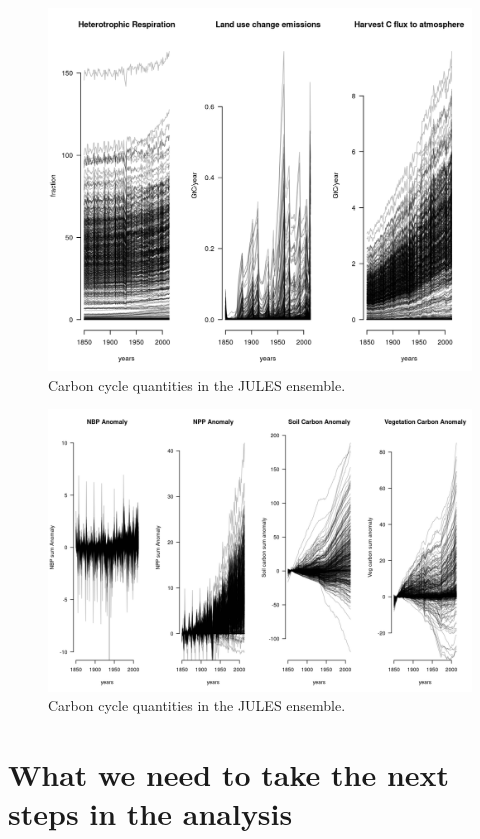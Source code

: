 \documentclass[gmd, manuscript]{copernicus}
\begin{document}
%
\begin{figure}[t]
\includegraphics[width=12cm]{./graphics/plot-carbon-cycle-timeseries-tertiary-1.png}
\caption{Carbon cycle quantities in the JULES ensemble.}
\end{figure}

%
\begin{figure}[t]
\includegraphics[width=12cm]{./graphics/plot-carbon-cycle-anomaly-timeseries-1}
\caption{Carbon cycle quantities in the JULES ensemble.}
\end{figure}





\section{What we need to take the next steps in the analysis}
\end{document}
